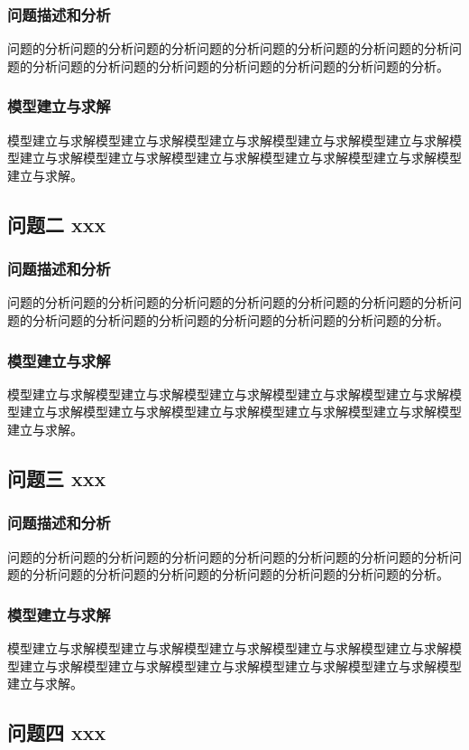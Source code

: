 \documentclass[bwprint]{gmcmthesis}
\numberwithin{figure}{section}
\begin{document}
\subsubsection{问题描述和分析}
问题的分析问题的分析问题的分析问题的分析问题的分析问题的分析问题的分析问题的分析问题的分析问题的分析问题的分析问题的分析问题的分析问题的分析。
\subsubsection{模型建立与求解}
模型建立与求解模型建立与求解模型建立与求解模型建立与求解模型建立与求解模型建立与求解模型建立与求解模型建立与求解模型建立与求解模型建立与求解模型建立与求解。


\subsection{问题二 xxx}
\subsubsection{问题描述和分析}
问题的分析问题的分析问题的分析问题的分析问题的分析问题的分析问题的分析问题的分析问题的分析问题的分析问题的分析问题的分析问题的分析问题的分析。
\subsubsection{模型建立与求解}
模型建立与求解模型建立与求解模型建立与求解模型建立与求解模型建立与求解模型建立与求解模型建立与求解模型建立与求解模型建立与求解模型建立与求解模型建立与求解。

\subsection{问题三 xxx}
\subsubsection{问题描述和分析}
问题的分析问题的分析问题的分析问题的分析问题的分析问题的分析问题的分析问题的分析问题的分析问题的分析问题的分析问题的分析问题的分析问题的分析。
\subsubsection{模型建立与求解}
模型建立与求解模型建立与求解模型建立与求解模型建立与求解模型建立与求解模型建立与求解模型建立与求解模型建立与求解模型建立与求解模型建立与求解模型建立与求解。

\subsection{问题四 xxx}
\end{document}
